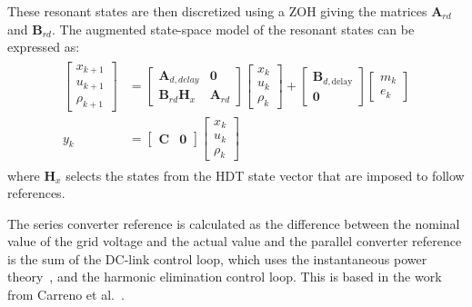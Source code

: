 These resonant states are then discretized using a ZOH giving the matrices $\mathbf{A}_{rd}$ and $\mathbf{B}_{rd}$. The augmented state-space model of the resonant states can be expressed as:
\begin{align}
    \begin{aligned}
        \begin{bmatrix}
            x_{k + 1}\\
            u_{k + 1}\\
            \rho_{k + 1}
        \end{bmatrix}
        &=
        \begin{bmatrix}
            \mathbf{A}_{d,delay} & \mathbf{0} \\
            \mathbf{B}_{rd}\mathbf{H}_x & \mathbf{A}_{rd}
        \end{bmatrix}
        \begin{bmatrix}
            x_k\\
            u_k\\
            \rho_k
        \end{bmatrix}
        +
        \begin{bmatrix}
            \mathbf{B}_{d,\text{delay}}\\
            \mathbf{0}
        \end{bmatrix}
        \begin{bmatrix}
            m_k\\
            e_k
        \end{bmatrix}
        \\
        y_k &= 
        \begin{bmatrix}
            \mathbf{C} & \mathbf{0}
        \end{bmatrix}
        \begin{bmatrix}
            x_k\\
            u_k\\
            \rho_k
        \end{bmatrix}
    \end{aligned}
\end{align}
where $\mathbf{H}_x$ selects the states from the HDT state vector that are imposed to follow references.

The series converter reference is calculated as the difference between the nominal value of the grid voltage and the actual value and the parallel converter reference is the sum of the DC-link control loop, which uses the instantaneous power theory~\cite{akagiControlStrategyActive1986}, and the harmonic elimination control loop. This is based in the work from Carreno et al.~\cite{carrenoStateFeedbackControlHybrid2024}.

